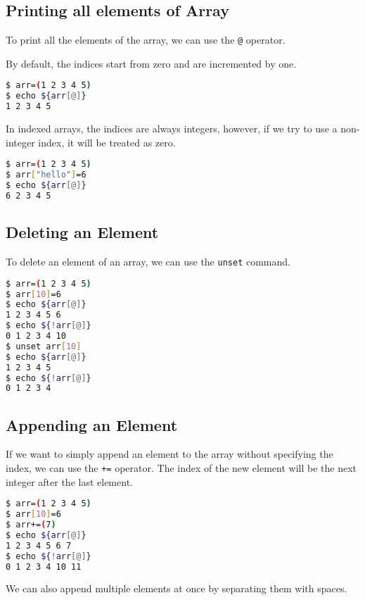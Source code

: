 \subsection{Printing all elements of Array}

To print all the elements of the array, we can use the \lstinline{@} operator.

By default, the indices start from zero and are incremented by one.

\begin{lstlisting}[language=bash]
$ arr=(1 2 3 4 5)
$ echo ${arr[@]}
1 2 3 4 5
\end{lstlisting}

In indexed arrays, the indices are always integers, however, if we try to use a non-integer index, it will be treated as zero.

\begin{lstlisting}[language=bash]
$ arr=(1 2 3 4 5)
$ arr["hello"]=6
$ echo ${arr[@]}
6 2 3 4 5
\end{lstlisting}

\subsection{Deleting an Element}

To delete an element of an array, we can use the \lstinline{unset} command.

\begin{lstlisting}[language=bash]
$ arr=(1 2 3 4 5)
$ arr[10]=6
$ echo ${arr[@]}
1 2 3 4 5 6
$ echo ${!arr[@]}
0 1 2 3 4 10
$ unset arr[10]
$ echo ${arr[@]}
1 2 3 4 5
$ echo ${!arr[@]}
0 1 2 3 4
\end{lstlisting}

\subsection{Appending an Element}

If we want to simply append an element to the array without specifying the index, we can use the \lstinline{+=} operator.
The index of the new element will be the next integer after the last element.

\begin{lstlisting}[language=bash]
$ arr=(1 2 3 4 5)
$ arr[10]=6
$ arr+=(7)
$ echo ${arr[@]}
1 2 3 4 5 6 7
$ echo ${!arr[@]}
0 1 2 3 4 10 11
\end{lstlisting}

We can also append multiple elements at once by separating them with spaces.

